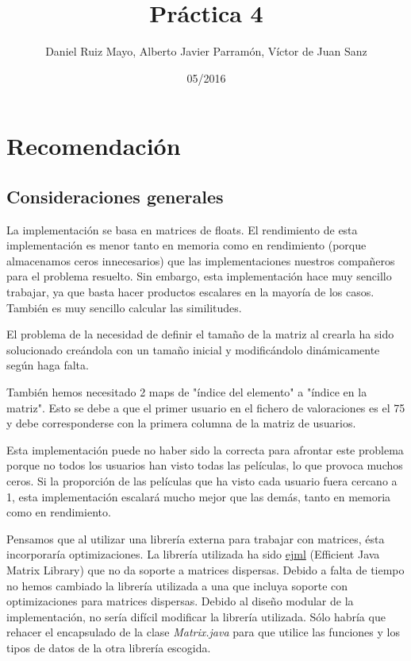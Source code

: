 \documentclass[palatino]{apuntes}
\title{Práctica 4}
\author{Daniel Ruiz Mayo, Alberto Javier Parramón, Víctor de Juan Sanz}
\date{05/2016}
\begin{document}
\pagestyle{plain}
\maketitle

\chapter{Recomendación}
\section{Consideraciones generales}

	La implementación se basa en matrices de floats. 
	El rendimiento de esta implementación es menor tanto en memoria como en rendimiento (porque almacenamos ceros innecesarios) que las implementaciones nuestros compañeros para el problema resuelto.
	Sin embargo, esta implementación hace muy sencillo trabajar, ya que basta hacer productos escalares en la mayoría de los casos. 
	También es muy sencillo calcular las similitudes.
	
	El problema de la necesidad de definir el tamaño de la matriz al crearla ha sido solucionado  creándola con un tamaño inicial y modificándolo dinámicamente según haga falta.

	También hemos necesitado 2 maps de "índice del elemento" a "índice en la matriz". 
	Esto se debe a que el primer usuario en el fichero de valoraciones es el 75 
	y debe corresponderse con la primera columna de la matriz de usuarios.

	Esta implementación puede no haber sido la correcta para afrontar este problema porque no todos los usuarios han visto todas las películas, lo que provoca muchos ceros. 
	Si la proporción de las películas que ha visto cada usuario fuera cercano a 1, esta implementación escalará mucho mejor que las demás, tanto en memoria como en rendimiento.
	

	Pensamos que al utilizar una librería externa para trabajar con matrices, ésta incorporaría optimizaciones. 
	La librería utilizada ha sido \href{http://ejml.org/wiki/index.php?title=Main_Page}{ejml} (Efficient Java Matrix Library) que no da soporte a matrices dispersas.
	Debido a falta de tiempo no hemos cambiado la librería utilizada a una que incluya soporte con optimizaciones para matrices dispersas.
	Debido al diseño modular de la implementación, no sería difícil modificar la librería utilizada.
	Sólo habría que rehacer el encapsulado de la clase \textit{Matrix.java} para que utilice las funciones y los tipos de datos de la otra librería escogida.
\end{document}
